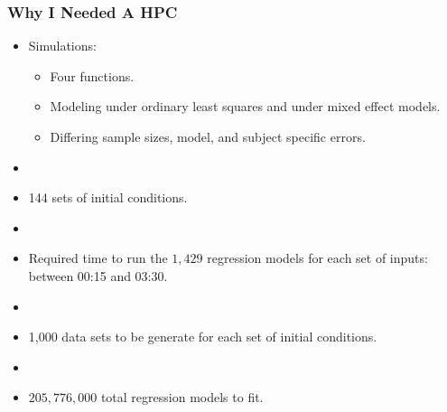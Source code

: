 \documentclass[10pt]{beamer}
\begin{document}
\begin{frame}[t]
  \frametitle{Why I Needed A HPC}
  \begin{itemize}
    \item Simulations:
      \begin{itemize}
        \item Four functions.
        \item Modeling under ordinary least squares and under mixed effect models.
        \item Differing sample sizes, model, and subject specific errors.
      \end{itemize}
    \item[]
    \item 144 sets of initial conditions.
    \item[]
    \item Required time to run the $1,429$ regression models for each set of
      inputs: between 00:15 and 03:30.
    \item[]
    \item 1,000 data sets to be generate for each set of initial conditions.  
    \item[]
    \item $205,776,000$ total regression models to fit.
  \end{itemize}
\end{frame}
\end{document}

